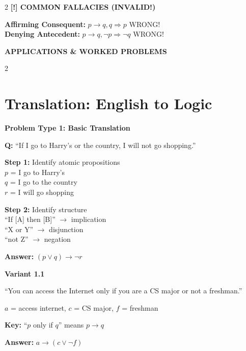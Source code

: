\documentclass[8pt,a4paper]{article}
\newenvironment{exbox}[1][]{\vspace{2pt}\noindent\textbf{#1}\par\smallskip}{\vspace{2pt}}
\newenvironment{warnbox}[1][]{\vspace{2pt}\noindent\textbf{[!] #1}\par\smallskip}{\vspace{2pt}}
\begin{document}
\begin{multicols}{2}
\begin{warnbox}[COMMON FALLACIES (INVALID!)]
\textbf{Affirming Consequent:} $p \to q, q \Rightarrow p$ \quad WRONG!\\
\textbf{Denying Antecedent:} $p \to q, \neg p \Rightarrow \neg q$ \quad WRONG!
\end{warnbox}

\end{multicols}

\newpage

\begin{center}
{\large\bfseries APPLICATIONS \& WORKED PROBLEMS}
\end{center}

\begin{multicols}{2}

\section{Translation: English to Logic}

\begin{exbox}[Problem Type 1: Basic Translation]
\textbf{Q:} ``If I go to Harry's or the country, I will not go shopping.''

\textbf{Step 1:} Identify atomic propositions\\
$p$ = I go to Harry's\\
$q$ = I go to the country\\
$r$ = I will go shopping

\textbf{Step 2:} Identify structure\\
``If [A] then [B]'' $\to$ implication\\
``X or Y'' $\to$ disjunction\\
``not Z'' $\to$ negation

\textbf{Answer:} $(p \lor q) \to \neg r$
\end{exbox}

\begin{exbox}[Variant 1.1]
``You can access the Internet only if you are a CS major or not a freshman.''

$a$ = access internet, $c$ = CS major, $f$ = freshman

\textbf{Key:} ``$p$ only if $q$'' means $p \to q$

\textbf{Answer:} $a \to (c \lor \neg f)$
\end{exbox}


\end{multicols}
\end{document}

